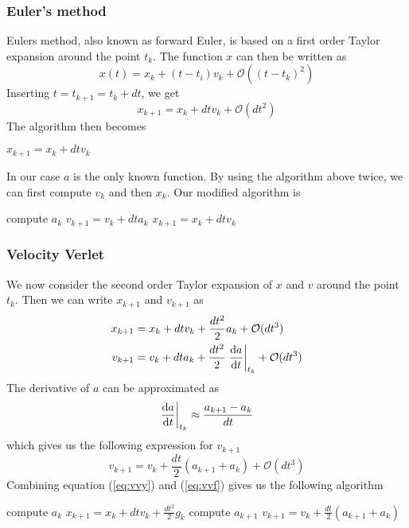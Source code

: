 \subsubsection{Euler's method}
\label{sec:fe}
Eulers method, also known as forward Euler, is based on a first order Taylor expansion around the point $t_k$. The function $x$ can then be written as
\begin{equation}
	x(t) = x_k + (t-t_i)v_k+\mathcal{O}\left(\left( t-t_k\right) ^2\right)
\end{equation}
Inserting $t=t_{k+1} = t_k + dt$, we get
\begin{equation}
	x_{k+1}=x_k + dtv_k + \mathcal{O}\left( dt^2\right)
\end{equation}
The algorithm then becomes
\begin{algorithm}[h!]
	\SetAlgoLined
		$x_{k+1} = x_k+dtv_k$\;
\end{algorithm}

In our case $a$ is the only known function. By using the algorithm above twice, we can first compute $v_k$ and then $x_k$. Our modified algorithm is
\begin{algorithm}[h!]
	\SetAlgoLined
		compute $a_k$\;
		$v_{k+1} = v_k+dta_k$\;
		$x_{k+1} = x_k+dtv_k$\;
\end{algorithm}

\subsubsection{Velocity Verlet}
\label{sec:vv}
We now consider the second order Taylor expansion of $x$ and $v$ around the point $t_k$. Then we can write $x_{k+1}$ and $v_{k+1}$ as
\begin{align} \label{eq:vvy}
	x_{k+1}&=x_k + dtv_k + \frac{dt^2}{2}a_k  +\mathcal{O}(dt^3) \\
	v_{k+1}&=v_k + dta_k + \frac{dt^2}{2}\left.\dv{a}{t}\right\rvert_{t_k}  +\mathcal{O}(dt^3)
\end{align}
The derivative of $a$ can be approximated as
\begin{equation}
	 \left.\dv{a}{t}\right\rvert_{t_k} \approx \frac{a_{k+1}-a_k}{dt}
\end{equation}
which gives us the following expression for $v_{k+1}$
\begin{equation}\label{eq:vvf}
	v_{k+1}=v_k + \frac{dt}{2}\left(a_{k+1} + a_k \right)  +\mathcal{O}(dt^3)
\end{equation}
Combining equation (\ref{eq:vvy}) and (\ref{eq:vvf}) gives us the following algorithm
\begin{algorithm}[h!]
	\SetAlgoLined
		compute $a_k$\;
		$x_{k+1} = x_k+dtv_k+\frac{dt^2}{2}g_k$\;
		compute $a_{k+1}$\;
		$v_{k+1} = v_k + \frac{dt}{2}\left(a_{k+1}+a_k\right)$\;
\end{algorithm}


